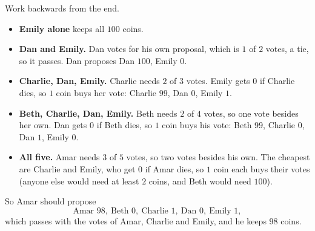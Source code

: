 Work backwards from the end.
\begin{itemize}
\item \textbf{Emily alone} keeps all $100$ coins.
\item \textbf{Dan and Emily.} Dan votes for his own proposal, which is $1$ of $2$ votes, a tie, so it passes. Dan proposes Dan $100$, Emily $0$.
\item \textbf{Charlie, Dan, Emily.} Charlie needs $2$ of $3$ votes. Emily gets $0$ if Charlie dies, so $1$ coin buys her vote: Charlie $99$, Dan $0$, Emily $1$.
\item \textbf{Beth, Charlie, Dan, Emily.} Beth needs $2$ of $4$ votes, so one vote besides her own. Dan gets $0$ if Beth dies, so $1$ coin buys his vote: Beth $99$, Charlie $0$, Dan $1$, Emily $0$.
\item \textbf{All five.} Amar needs $3$ of $5$ votes, so two votes besides his own. The cheapest are Charlie and Emily, who get $0$ if Amar dies, so $1$ coin each buys their votes (anyone else would need at least $2$ coins, and Beth would need $100$).
\end{itemize}
So Amar should propose
\[\boxed{\text{Amar }98,\ \text{Beth }0,\ \text{Charlie }1,\ \text{Dan }0,\ \text{Emily }1},\]
which passes with the votes of Amar, Charlie and Emily, and he keeps $98$ coins.
